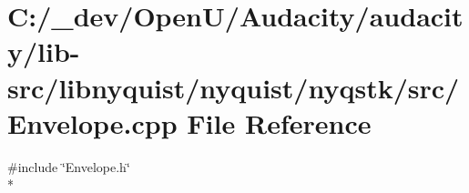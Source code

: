 \hypertarget{lib-src_2libnyquist_2nyquist_2nyqstk_2src_2_envelope_8cpp}{}\section{C\+:/\+\_\+dev/\+Open\+U/\+Audacity/audacity/lib-\/src/libnyquist/nyquist/nyqstk/src/\+Envelope.cpp File Reference}
\label{lib-src_2libnyquist_2nyquist_2nyqstk_2src_2_envelope_8cpp}
{\ttfamily \#include \char`\"{}Envelope.\+h\char`\"{}}\\*
